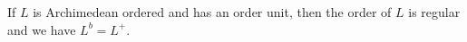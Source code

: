If $L$ is Archimedean ordered and has an order unit, then the order of $L$ is regular and we have $L^b = L^+$.
